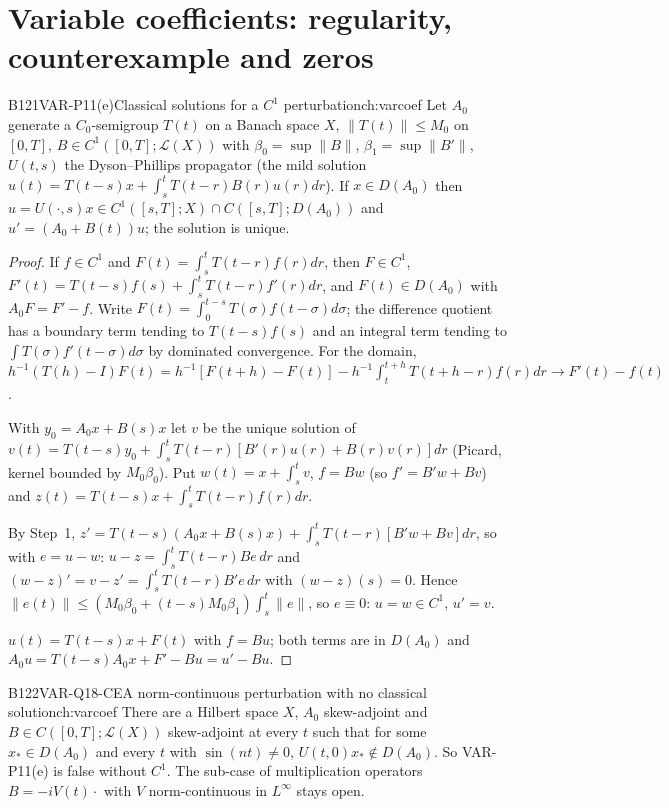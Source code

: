 \section{Variable coefficients: regularity, counterexample and zeros}

\begin{dimcard}{B121}{VAR-P11(e)}{Classical solutions for a $C^1$ perturbation}{\pw}{ch:varcoef}
Let $A_0$ generate a $C_0$-semigroup $T(t)$ on a Banach space $X$, $\|T(t)\|\le M_0$ on $[0,T]$, $B\in C^1([0,T];\mathcal L(X))$ with $\beta_0=\sup\|B\|$, $\beta_1=\sup\|B'\|$, $U(t,s)$ the Dyson--Phillips propagator (the mild solution $u(t)=T(t-s)x+\int_s^tT(t-r)B(r)u(r)dr$). If $x\in D(A_0)$ then $u=U(\cdot,s)x\in C^1([s,T];X)\cap C([s,T];D(A_0))$ and $u'=(A_0+B(t))u$; the solution is unique.
\end{dimcard}

\begin{proof}
If $f\in C^1$ and $F(t)=\int_s^tT(t-r)f(r)dr$, then $F\in C^1$, $F'(t)=T(t-s)f(s)+\int_s^tT(t-r)f'(r)dr$, and $F(t)\in D(A_0)$ with $A_0F=F'-f$. Write $F(t)=\int_0^{t-s}T(\sigma)f(t-\sigma)d\sigma$; the difference quotient has a boundary term tending to $T(t-s)f(s)$ and an integral term tending to $\int T(\sigma)f'(t-\sigma)d\sigma$ by dominated convergence. For the domain, $h^{-1}(T(h)-I)F(t)=h^{-1}[F(t+h)-F(t)]-h^{-1}\int_t^{t+h}T(t+h-r)f(r)dr\to F'(t)-f(t)$.

With $y_0=A_0x+B(s)x$ let $v$ be the unique solution of $v(t)=T(t-s)y_0+\int_s^tT(t-r)[B'(r)u(r)+B(r)v(r)]dr$ (Picard, kernel bounded by $M_0\beta_0$). Put $w(t)=x+\int_s^tv$, $f=Bw$ (so $f'=B'w+Bv$) and $z(t)=T(t-s)x+\int_s^tT(t-r)f(r)dr$.

By Step~1, $z'=T(t-s)(A_0x+B(s)x)+\int_s^tT(t-r)[B'w+Bv]dr$, so with $e=u-w$: $u-z=\int_s^tT(t-r)Be\,dr$ and $(w-z)'=v-z'=\int_s^tT(t-r)B'e\,dr$ with $(w-z)(s)=0$. Hence $\|e(t)\|\le(M_0\beta_0+(t-s)M_0\beta_1)\int_s^t\|e\|$, so $e\equiv0$: $u=w\in C^1$, $u'=v$.

$u(t)=T(t-s)x+F(t)$ with $f=Bu$; both terms are in $D(A_0)$ and $A_0u=T(t-s)A_0x+F'-Bu=u'-Bu$.

\end{proof}

\begin{dimcard}{B122}{VAR-Q18-CE}{A norm-continuous perturbation with no classical solution}{\pw}{ch:varcoef}
There are a Hilbert space $X$, $A_0$ skew-adjoint and $B\in C([0,T];\mathcal L(X))$ skew-adjoint at every $t$ such that for some $x_*\in D(A_0)$ and every $t$ with $\sin(nt)\ne0$, $U(t,0)x_*\notin D(A_0)$. So VAR-P11(e) is false without $C^1$. The sub-case of multiplication operators $B=-iV(t)\cdot$ with $V$ norm-continuous in $L^\infty$ stays open.
\end{dimcard}

